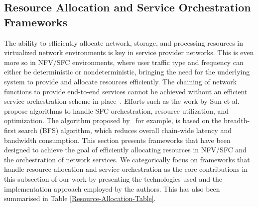 \documentclass[futureinternet,review,accept,pdftex,moreauthors]{Definitions/mdpi}
\begin{document}
\subsection{Resource Allocation and Service Orchestration Frameworks}
\label{Resource Allocation & Service Orchestration frameworks}
The ability to efficiently allocate network, storage, and processing resources in virtualized network environments is key in service provider networks. This is even more so in NFV/SFC environments, where user traffic type and frequency can either be deterministic or nondeterministic, bringing the need for the underlying system to provide and allocate resources efficiently. The chaining of network functions to provide end-to-end services cannot be achieved without an efficient service orchestration scheme in place~\cite{huang2021scalable}. 
Efforts such as the work by Sun {et al.}~\cite{sun2019low} propose algorithms to handle SFC orchestration, resource utilization, and optimization. The algorithm proposed by~\cite{sun2019low} for example, is based on the breadth-first search (BFS) algorithm, which reduces overall chain-wide latency and bandwidth consumption. This section presents frameworks that have been designed to achieve the goal of efficiently allocating resources in NFV/SFC and the orchestration of network services. We categorically focus on frameworks that handle resource allocation and service orchestration as the core contributions in this subsection of our work by presenting the technologies used and the implementation approach employed by the authors. This has also been summarised in Table \ref{Resource-Allocation-Table}.

\end{document}
